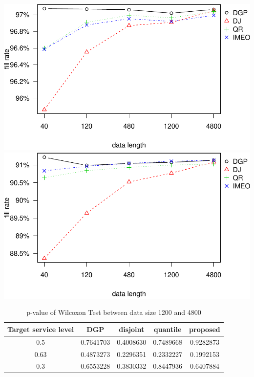 \documentclass[
]{article}
\begin{document}
\includegraphics{linear-norm-plot_files/figure-latex/fr-2.pdf}
\includegraphics{linear-norm-plot_files/figure-latex/fr-3.pdf}

\begin{table}

\caption{\label{tab:Wilcoxon}p-value of Wilcoxon Test between data size 1200 and 4800}
\centering
\begin{tabular}[t]{ccccc}
\toprule
Target service level & DGP & disjoint & quantile & proposed\\
\midrule
\rowcolor{gray!6}  0.5 & 0.7641703 & 0.4008630 & 0.7489668 & 0.9282873\\
0.63 & 0.4873273 & 0.2296351 & 0.2332227 & 0.1992153\\
\rowcolor{gray!6}  0.3 & 0.6553228 & 0.3830332 & 0.8447936 & 0.6407884\\
\bottomrule
\end{tabular}
\end{table}
\end{document}
